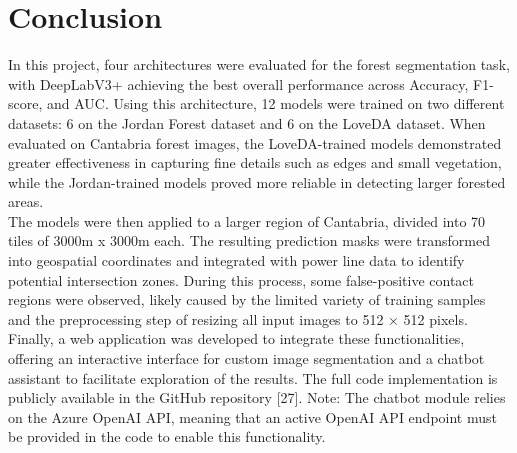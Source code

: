 \chapter{Conclusion}
In this project, four architectures were evaluated for the forest segmentation task, with DeepLabV3+ achieving the best overall performance across Accuracy, F1-score, and AUC. Using this architecture, 12 models were trained on two different datasets: 6 on the Jordan Forest dataset and 6 on the LoveDA dataset. When evaluated on Cantabria forest images, the LoveDA-trained models demonstrated greater effectiveness in capturing fine details such as edges and small vegetation, while the Jordan-trained models proved more reliable in detecting larger forested areas.\\

The models were then applied to a larger region of Cantabria, divided into 70 tiles of 3000m x 3000m each. The resulting prediction masks were transformed into geospatial coordinates and integrated with power line data to identify potential intersection zones. During this process, some false-positive contact regions were observed, likely caused by the limited variety of training samples and the preprocessing step of resizing all input images to 512 × 512 pixels.\\

Finally, a web application was developed to integrate these functionalities, offering an interactive interface for custom image segmentation and a chatbot assistant to facilitate exploration of the results. The full code implementation is publicly available in the GitHub repository [27]. Note: The chatbot module relies on the Azure OpenAI API, meaning that an active OpenAI API endpoint must be provided in the code to enable this functionality.